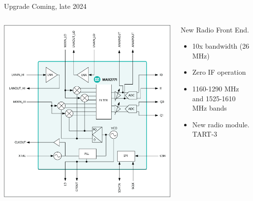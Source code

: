 \documentclass[ignorenonframetext]{beamer}
\begin{document}
\begin{frame}{Upgrade Coming, late 2024}
  \begin{columns}
  \begin{column}{0.4\linewidth}
    \includegraphics[width=\linewidth]{fig/max2771.png}
  \end{column}
  \begin{column}{0.6\linewidth}
  New Radio Front End.
\begin{itemize}
 \item 10x bandwidth (26 MHz)
 \item Zero IF operation
 \item 1160-1290 MHz and 1525-1610 MHz bands
 \item New radio module. TART-3
\end{itemize}

  \end{column}
  \end{columns}
\end{frame}

% 
% 
\end{document}
